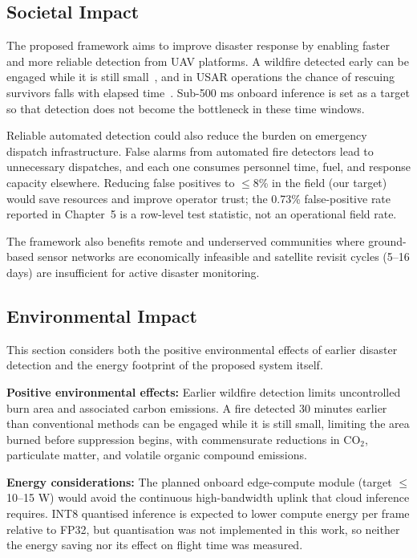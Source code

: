 \documentclass[journal]{IEEEtran}
\begin{document}
\subsection{Societal Impact}

The proposed framework aims to improve disaster response by enabling faster and more reliable detection from UAV platforms. A wildfire detected early can be engaged while it is still small~\cite{merino2012unmanned}, and in USAR operations the chance of rescuing survivors falls with elapsed time~\cite{erdelj2017help}. Sub-500 ms onboard inference is set as a target so that detection does not become the bottleneck in these time windows.

Reliable automated detection could also reduce the burden on emergency dispatch infrastructure. False alarms from automated fire detectors lead to unnecessary dispatches, and each one consumes personnel time, fuel, and response capacity elsewhere. Reducing false positives to $\leq$8\% in the field (our target) would save resources and improve operator trust; the 0.73\% false-positive rate reported in Chapter~5 is a row-level test statistic, not an operational field rate.

The framework also benefits remote and underserved communities where ground-based sensor networks are economically infeasible and satellite revisit cycles (5--16 days) are insufficient for active disaster monitoring.

\subsection{Environmental Impact}

This section considers both the positive environmental effects of earlier disaster detection and the energy footprint of the proposed system itself.

\textbf{Positive environmental effects:} Earlier wildfire detection limits uncontrolled burn area and associated carbon emissions. A fire detected 30 minutes earlier than conventional methods can be engaged while it is still small, limiting the area burned before suppression begins, with commensurate reductions in CO$_2$, particulate matter, and volatile organic compound emissions.

\textbf{Energy considerations:} The planned onboard edge-compute module (target $\leq$10--15 W) would avoid the continuous high-bandwidth uplink that cloud inference requires. INT8 quantised inference is expected to lower compute energy per frame relative to FP32, but quantisation was not implemented in this work, so neither the energy saving nor its effect on flight time was measured.
\end{document}
